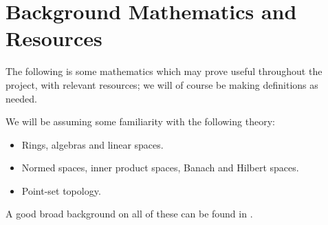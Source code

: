 \documentclass[12pt,a4paper]{report}
\theoremstyle{plain}
\theoremstyle{definition}
\newcommand{\1}{\mathbbm{1}}
\begin{document}
\iffalse 
Research in C$^\ast$-algebras is still very much active, with much work going into, for example: 
amenable C$^\ast$ algebras and classification of approximately-finite dimensional (AF) C$^\ast$ 
algebras; 
actions of compact groups on C$^\ast$ algebras; 
classification of separable simple nuclear C$^\ast$ algebras; 
single operator theory and spectral theory; 
operator K-theory, K-homology and KK-theory; 
*-derivations;
homogeneous C$^\ast$-algebras.


Lin \cite{lin01} gives a summary of the state of the K-theoretical classification of amenable C$^\ast$-algebras, building on Elliott's summary \cite{elliott94} of research on the topic. 
Lin is also prolific in research on classification of C$^\ast$-algebras in general, for example \cite{lin08,lin11} are considered important papers on the topic.
The Ph.D. thesis \cite{gardella15} of Gardella concerns itself in part with classifying the actions of compact groups on C$^\ast$-algebras.
Pedersen \cite{pedersen79} covers most of the usual basic theory before moving on to cover a great deal of advanced theory, including automorphism groups of C$^\ast$-algebras and spectral theory for such groups.
J.M.G. Fell \cite{fell61} uses theory of fibre bundles, homogeneous algebras and algebras of continuous trace, to get at the group C$^\ast$-algebra for SL$(2,\mathbb{C})$.
Niemiec \cite{niemiec12} gives an elementary proof of a result \cite[Theorem 3.2]{fell61} from Fell, on $n$-homogeneous C$^\ast$-algebras, and proposes a spectral theorem for these $n$-homogeneous systems.
\fi

\chapter{Background Mathematics and Resources}	
The following is some mathematics which may prove useful throughout the project, with relevant 
resources; we will of course be making definitions as needed.
	
We will be assuming some familiarity with the following theory:
\begin{itemize}
	\item Rings, algebras and linear spaces.
	\item Normed spaces, inner product spaces, Banach and Hilbert spaces.
	\item Point-set topology.
\end{itemize}
A good broad background on all of these can be found in \cite{simmons83}.
\end{document}
